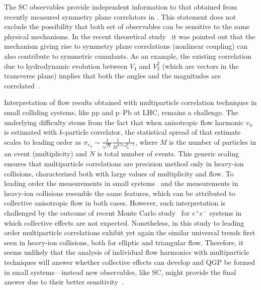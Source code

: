 The SC observables provide independent information to that obtained from recently measured symmetry plane correlators in \cite{ALICE:2011ab,Adare:2011tg,Aad:2014fla}. This statement does not exclude the possibility that both set of observables can be sensitive to the same physical mechanisms. In the recent theoretical study~\cite{Giacalone:2016afq} it was pointed out that the mechanism giving rise to symmetry plane correlations (nonlinear coupling) can also contribute to symmetric cumulants. As an  example, the existing correlation due to hydrodynamic evolution between $V_4$ and $V_2^2$ (which are vectors in the transverse plane) implies that both the angles and the magnitudes are correlated~\cite{Giacalone:2016afq}. 

Interpretation of flow results obtained with multiparticle correlation techniques in small colliding systems, like pp and p--Pb at LHC, remains a challenge. The underlying difficulty stems from the fact that when anisotropic flow harmonic $v_n$ is estimated with $k$-particle correlator, the statistical spread of that estimate scales to leading order as $\sigma_{v_{n}}\sim\frac{1}{\sqrt{N}}\frac{1}{M^{k/2}}\frac{1}{v_{n}^{k-1}}$, where $M$ is the number of particles in an event (multiplicity) and $N$ is total number of events. This generic scaling ensures that multiparticle correlations are precision method only in heavy-ion collisions, characterized both with large values of multiplicity and flow. To leading order the measurements in small systems~\cite{Aad:2013fja,Abelev:2014mda,Khachatryan:2015waa,Adamczyk:2015xjc,Adare:2015ctn} and the measurements in heavy-ion collisions resemble the same features, which can be attributed to collective anisotropic flow in both cases. However, such interpretation is challenged by the outcome of recent Monte Carlo study~\cite{Loizides:2016tew} for $e^+e^-$ systems in which collective effects are not expected. Nonetheless, in this study to leading order multiparticle correlations exhibit yet again the similar universal trends first seen in heavy-ion collisions, both for elliptic and triangular flow. Therefore, it seems unlikely that the analysis of individual flow harmonics with multiparticle techniques will answer whether collective effects can develop and QGP be formed in small systems---instead new observables, like SC, might provide the final answer due to their better sensitivity~\cite{Niemi:2012aj,ALICE:2016kpq}.


